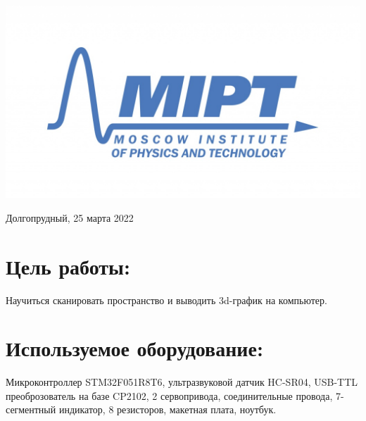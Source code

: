 \documentclass[a4paper, 12pt, twoside]{article}
\newenvironment{bottompar}{\par\vspace*{\fill}}{\clearpage}
\begin{document}
\begin{titlepage}
~


\begin{bottompar}
	\begin{center}
		\includegraphics[width = 80 mm]{logo.jpg}
	\end{center}
	{\large Долгопрудный, 25 марта 2022}

\end{bottompar}
\vfill %

\end{titlepage}

\section*{Цель работы:}
Научиться сканировать пространство и выводить 3d-график на компьютер.

\section*{Используемое оборудование:}
Микроконтроллер STM32F051R8T6, ультразвуковой датчик HC-SR04, USB-TTL преоброзователь на базе CP2102, 2 сервопривода, соединительные провода, 7-сегментный индикатор, 8 резисторов, макетная плата, ноутбук.    
\end{document}
